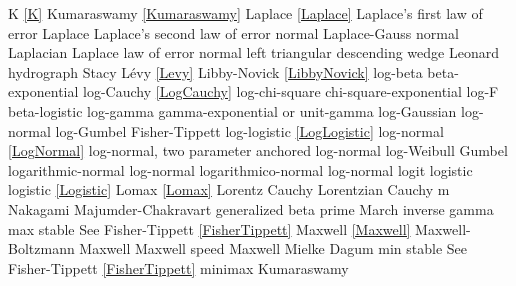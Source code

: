 K							\dotfill	\eqref{K}							\ncite	%
Kumaraswamy					\dotfill	\eqref{Kumaraswamy} 				\ncite	%
%
Laplace						\dotfill	\eqref{Laplace} 						\ncite	%
Laplace's first law of error			\dotfill	Laplace 							\ncite	%
Laplace's second law of error  		\dotfill	normal 							\ncite	%
Laplace-Gauss					\dotfill	normal 							\ncite	%
Laplacian  					\dotfill	Laplace							\ncite 	%
law of error					\dotfill	normal 							\ncite	%
left triangular					\dotfill	descending wedge					\ncite	%
Leonard hydrograph				\dotfill	Stacy 							\ncite	%
L\'{e}vy 						\dotfill	\eqref{Levy}						\ncite	%
Libby-Novick					\dotfill	\eqref{LibbyNovick}					\ncite	
log-beta						\dotfill	beta-exponential					 	%
log-Cauchy					\dotfill	\eqref{LogCauchy}					\ncite
log-chi-square					\dotfill	chi-square-exponential				\ncite	%
log-F							\dotfill	beta-logistic						\ncite	%
log-gamma 					\dotfill	gamma-exponential or unit-gamma		\ncite	%
log-Gaussian					\dotfill	log-normal						\ncite	%
log-Gumbel					\dotfill	Fisher-Tippett						\ncite	%
log-logistic					\dotfill	\eqref{LogLogistic}  					\ncite	%
log-normal					\dotfill	\eqref{LogNormal}					\ncite	%
log-normal, two parameter			\dotfill	anchored log-normal					\ncite	%
log-Weibull 					\dotfill	Gumbel 							\ncite	%
logarithmic-normal				\dotfill	log-normal 						\ncite	%
logarithmico-normal				\dotfill	log-normal 						\ncite	%
logit							\dotfill	logistic 							\ncite	%
logistic 						\dotfill	\eqref{Logistic} 						\ncite	%
Lomax 						\dotfill	\eqref{Lomax}						\ncite	%
Lorentz  						\dotfill	Cauchy 							\ncite	%
Lorentzian  					\dotfill	Cauchy 							\ncite	%
%
m 							\dotfill	Nakagami 						 	%
Majumder-Chakravart			\dotfill	generalized beta prime				 %
March 						\dotfill	inverse gamma						\ncite	%
max stable					\dotfill	See Fisher-Tippett \eqref{FisherTippett}	\ncite
Maxwell 						\dotfill	\eqref{Maxwell} 					\ncite	%
Maxwell-Boltzmann 				\dotfill	Maxwell 							\ncite 	%
Maxwell speed					\dotfill	Maxwell 							\ncite	%
Mielke						\dotfill	Dagum							\ncite	%
min stable						\dotfill	See Fisher-Tippett \eqref{FisherTippett}	\ncite
minimax 						\dotfill	Kumaraswamy 						 	%
